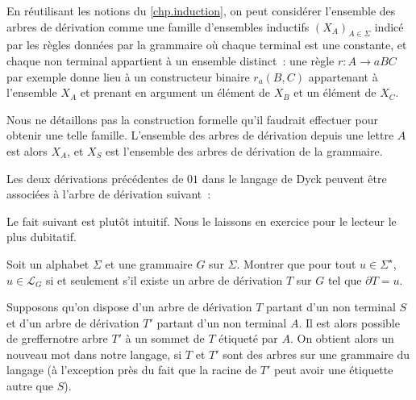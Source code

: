 \begin{remark}
    En réutilisant les notions du \cref{chp.induction}, on peut considérer
    l'ensemble des arbres de dérivation comme une famille d'ensembles
    inductifs $(X_A)_{A \in \Sigma}$ indicé par les règles données par la
    grammaire où chaque terminal est une constante, et chaque non terminal
    appartient à un ensemble distinct~: une règle $r : A \to aBC$ par
    exemple donne lieu à un constructeur binaire $r_a(B,C)$ appartenant à
    l'ensemble $X_A$ et prenant en argument un élément de $X_B$ et un élément de
    $X_C$.

    Nous ne détaillons pas la construction formelle qu'il faudrait effectuer pour
    obtenir une telle famille. L'ensemble des arbres de dérivation depuis une
    lettre $A$ est alors $X_A$, et $X_S$ est l'ensemble des arbres de dérivation
    de la grammaire.
\end{remark}

\begin{example}
  Les deux dérivations précédentes de $01$ dans le langage de Dyck peuvent être
  associées à l'arbre de dérivation suivant~:
  \begin{figure}[h]
  \centering
\end{figure}
\end{example}

Le fait suivant est plutôt intuitif. Nous le laissons en exercice pour le
lecteur le plus dubitatif.

\begin{exercise}
  Soit un alphabet $\Sigma$ et une grammaire $G$ sur $\Sigma$. Montrer que
  pour tout $u \in \Sigma^\star$, $u \in \mathcal L_G$ si et seulement s'il
  existe un arbre de dérivation $T$ sur $G$ tel que $\partial T = u$.
\end{exercise}

Supposons qu'on dispose d'un arbre de dérivation $T$ partant d'un non terminal
$S$ et d'un arbre de dérivation $T'$ partant d'un non terminal $A$. Il est alors
possible de \og greffer\fg notre arbre $T'$ à un sommet de $T$ étiqueté par $A$.
On obtient alors un nouveau mot dans notre langage, si $T$ et $T'$ sont des
arbres sur une grammaire du langage (à l'exception près du fait que la racine
de $T'$ peut avoir une étiquette autre que $S$).

